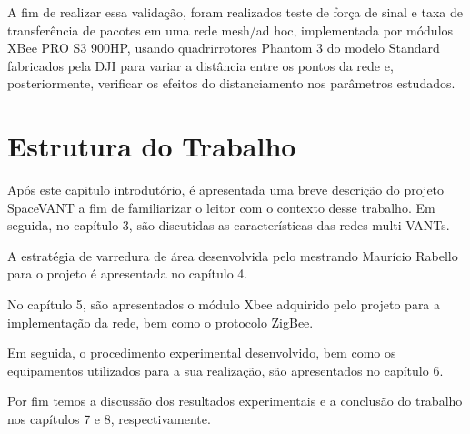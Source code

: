 A fim de realizar essa validação, foram realizados teste de força de sinal e taxa de transferência de pacotes em uma rede mesh/ad hoc, implementada por módulos XBee PRO S3 900HP, usando quadrirrotores Phantom 3 do modelo Standard fabricados pela DJI para variar a distância entre os pontos da rede e, posteriormente, verificar os efeitos do distanciamento nos parâmetros estudados.

\section{Estrutura do Trabalho}

Após este capitulo introdutório, é apresentada uma breve descrição do projeto SpaceVANT a fim de familiarizar o leitor com o contexto desse trabalho. Em seguida, no capítulo 3, são discutidas as características das redes multi VANTs. 

A estratégia de varredura de área desenvolvida pelo mestrando Maurício Rabello para o projeto é apresentada no capítulo 4. 

No capítulo 5, são apresentados o módulo Xbee adquirido pelo projeto para a implementação da rede, bem como o protocolo ZigBee. 

Em seguida, o procedimento experimental desenvolvido, bem como os equipamentos utilizados para a sua realização, são apresentados no capítulo 6.

Por fim temos a discussão dos resultados experimentais e a conclusão do trabalho nos capítulos 7 e 8, respectivamente.  
